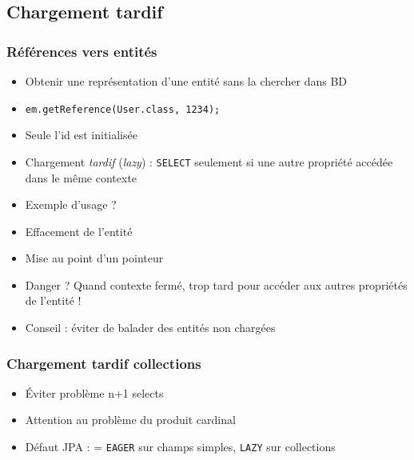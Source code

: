 \documentclass[english, french]{beamer}
\begin{document}
\subsection{Chargement tardif}
\begin{frame}
	\frametitle{Références vers entités}
	\begin{itemize}
		\item Obtenir une représentation d’une entité sans la chercher dans BD
		\item \texttt{em.getReference(User.class, 1234);}
		\item Seule l’id est initialisée
		\item Chargement \emph{tardif} (\emph{lazy}) : \texttt{SELECT} seulement si une autre propriété accédée {\tiny dans le même contexte}
		\item Exemple d’usage ? \pause
		\item Effacement de l’entité
		\item Mise au point d’un pointeur \pause
		\item Danger ? \pause Quand contexte fermé, trop tard pour accéder aux autres propriétés de l’entité !
		\item Conseil : éviter de balader des entités non chargées
	\end{itemize}
\end{frame}

\begin{frame}
	\frametitle{Chargement tardif collections}
	\begin{itemize}
		\item Éviter problème n+1 selects %
		\item Attention au problème du produit cardinal
		\item Défaut JPA :  = \texttt{EAGER} sur champs simples, \texttt{LAZY} sur collections
	\end{itemize}
\end{frame}
\end{document}
